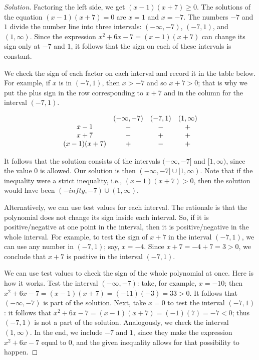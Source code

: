 \documentclass{ximera}
\begin{document}
\begin{proof}[Solution]

Factoring the left side, we get $(x-1)(x+7) \geq 0$.  The solutions of the equation $(x-1)(x+7)=0$ are $x = 1$ and $x=-7$.  The numbers $-7$ and $1$ divide the number line into three intervals: $(-\infty, -7)$, $(-7, 1)$, and $(1, \infty)$.  Since the expression $x^2+6x-7 = (x-1)(x+7)$ can change its sign only at $-7$ and $1$, it follows that the sign on each of these intervals is constant.

We check the sign of each factor on each interval and record it in the table below.  For example, if $x$ is in $(-7, 1)$, then $x > -7$ and so $x+7 > 0$;
that is why we put the plus sign in the row corresponding to $x+7$ and in the column for the interval $(-7, 1)$.

$$
\begin{array}{c c c c}
	& (-\infty, -7) & (-7, 1) & (1, \infty) \\
  x-1 & - & - & + \\
  x+7 & - & + & + \\
  (x-1)(x+7) & + & - & + \\
\end{array}
$$

It follows that the solution consists of the intervals $(-\infty, -7]$ and $[1,\infty)$, since the value $0$ is allowed.  Our solution is then $(-\infty, -7] \cup [1,\infty)$.
Note that if the inequality were a strict inequality, i.e., $(x-1)(x+7) > 0$, then the solution would have been $(-infty, -7) \cup (1,\infty)$.

Alternatively, we can use test values for each interval.  The rationale is that the polynomial does not change its sign inside each interval.  So, if it is positive/negative
at one point in the interval, then it is positive/negative in the whole interval.  For example, to test the sign of $x+7$ in the interval $(-7,1)$, we can use any
number in $(-7,1)$; say, $x=-4$.  Since $x+7 = -4 + 7 = 3 > 0$, we conclude that $x+7$ is positive in the interval $(-7,1)$.

We can use test values to check the sign of the whole polynomial at once.  Here is how it works.  Test the interval $(-\infty, -7)$: take, for example, $x=-10$;
then $x^2+6x-7 = (x-1)(x+7) = (-11)(-3)= 33 > 0$.  It follows that $(-\infty, -7)$ is part of the solution.  Next, take $x=0$ to test the interval $(-7,1)$: it
follows that $x^2+6x-7 = (x-1)(x+7) = (-1)(7) = -7 < 0$; thus $(-7, 1)$ is not a part of the solution.  Analogously, we check the interval $(1,\infty)$.  In the
end, we include $-7$ and $1$, since they make the expression $x^2+6x-7$ equal to $0$, and the given inequality allows for that possibility to happen.
\end{proof}
\end{document}
